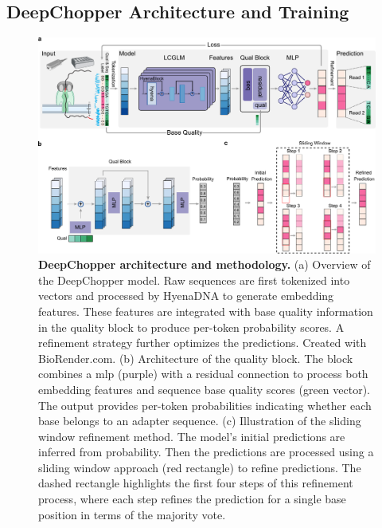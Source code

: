 \documentclass[pdflatex,sn-nature, lineno]{sn-jnl}%
\begin{document}
\subsection{DeepChopper Architecture and Training}\label{subsec:deepchopper_architecture}

\begin{figure}[!ht]
	\includegraphics[height=0.63\columnwidth]{finals/figure1}
	\caption{{\bf DeepChopper architecture and methodology.} (a) Overview of the DeepChopper model. Raw sequences are first tokenized into vectors and processed by HyenaDNA to generate embedding features. These features are integrated with base quality information in the quality block to produce per-token probability scores. A refinement strategy further optimizes the predictions. Created with BioRender.com. (b) Architecture of the quality block. The block combines a \gls{mlp} (purple) with a residual connection to process both embedding features and sequence base quality scores (green vector). The output provides per-token probabilities indicating whether each base belongs to an adapter sequence. (c) Illustration of the sliding window refinement method. The model's initial predictions are inferred from probability. Then the predictions are processed using a sliding window approach (red rectangle) to refine predictions. The dashed rectangle highlights the first four steps of this refinement process, where each step refines the prediction for a single base position in terms of the majority vote.}\label{fig:f1}
\end{figure}
\end{document}

